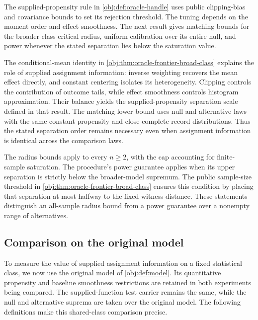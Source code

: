\documentclass[11pt]{article}
\begin{document}
The supplied-propensity rule  in \cref{obj:def:oracle-handle} uses public clipping-bias and covariance bounds to set its rejection threshold. The tuning depends on the moment order and effect smoothness. The next result gives matching bounds for the broader-class critical radius, uniform calibration over its entire null, and power whenever the stated separation lies below the saturation value.



The conditional-mean identity in \cref{obj:thm:oracle-frontier-broad-class} explains the role of supplied assignment information: inverse weighting recovers the mean effect directly, and constant centering isolates its heterogeneity. Clipping controls the contribution of outcome tails, while effect smoothness controls histogram approximation. Their balance yields the supplied-propensity separation scale  defined in that result. The matching lower bound uses null and alternative laws with the same constant propensity and close complete-record distributions. Thus the stated separation order remains necessary even when assignment information is identical across the comparison laws.

The radius bounds apply to every \(n\ge2\), with the cap accounting for finite-sample saturation. The procedure's power guarantee applies when its upper separation is strictly below the broader-model supremum. The public sample-size threshold in \cref{obj:thm:oracle-frontier-broad-class} ensures this condition by placing that separation at most halfway to the fixed witness distance. These statements distinguish an all-sample radius bound from a power guarantee over a nonempty range of alternatives.

\subsection{Comparison on the original model}

To measure the value of supplied assignment information on a fixed statistical class, we now use the original model of \cref{obj:def:model}. Its quantitative propensity and baseline smoothness restrictions are retained in both experiments being compared. The supplied-function test carrier remains the same, while the null and alternative suprema are taken over the original model. The following definitions make this shared-class comparison precise.
\end{document}

